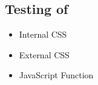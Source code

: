\documentclass[12pt]{report}
\renewcommand{\_}{\kern-1.5pt\textunderscore\kern-1.5pt}
\begin{document}
\vspace{\baselineskip}
\subsection{Testing of}

\vspace{\baselineskip}
\begin{itemize}
	\item \textcolor[HTML]{0D0D0D}{Internal CSS}\par

	\item \textcolor[HTML]{0D0D0D}{External CSS}\par

	\item \textcolor[HTML]{0D0D0D}{JavaScript Function}
\end{itemize}\par


\vspace{\baselineskip}

\vspace{\baselineskip}
\end{document}
